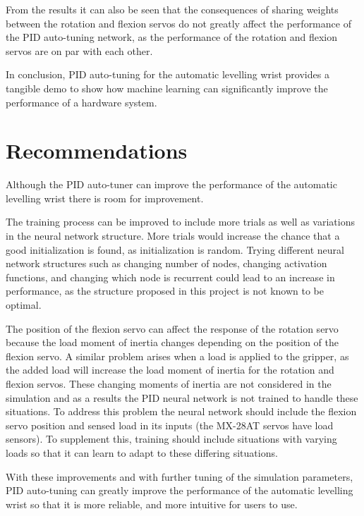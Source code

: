\documentclass[letterpaper,12pt]{article}
\begin{document}
From the results it can also be seen that the consequences of sharing weights between the rotation and flexion servos do not greatly affect the performance of the PID auto-tuning network, as the performance of the rotation and flexion servos are on par with each other.

In conclusion, PID auto-tuning for the automatic levelling wrist provides a tangible demo to show how machine learning can significantly improve the performance of a hardware system.

\section{Recommendations}
Although the PID auto-tuner can improve the performance of the automatic levelling wrist there is room for improvement.

The training process can be improved to include more trials as well as variations in the neural network structure. More trials would increase the chance that a good initialization is found, as initialization is random. Trying different neural network structures such as changing number of nodes, changing activation functions, and changing which node is recurrent could lead to an increase in performance, as the structure proposed in this project is not known to be optimal.

The position of the flexion servo can affect the response of the rotation servo because the load moment of inertia changes depending on the position of the flexion servo. A similar problem arises when a load is applied to the gripper, as the added load will increase the load moment of inertia for the rotation and flexion servos. These changing moments of inertia are not considered in the simulation and as a results the PID neural network is not trained to handle these situations. To address this problem the neural network should include the flexion servo position and sensed load in its inputs (the MX-28AT servos have load sensors). To supplement this, training should include situations with varying loads so that it can learn to adapt to these differing situations.

With these improvements and with further tuning of the simulation parameters, PID auto-tuning can greatly improve the performance of the automatic levelling wrist so that it is more reliable, and more intuitive for users to use.
\pagebreak
\end{document}
